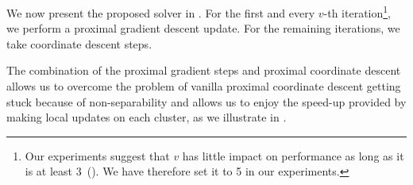 We now present the proposed solver in .
For the first and every $v$-th iteration\footnote{Our experiments suggest that \(v\) has little impact on performance as long as it is at least 3~(). We have therefore set it to 5 in our experiments.}, we perform a proximal gradient descent update.
For the remaining iterations, we take coordinate descent steps.

\begin{algorithm}[hbt]
  \caption{%
    Hybrid coordinate descent and proximal gradient descent algorithm
    for SLOPE\label{alg:hybrid}}

  \Return{\(\beta\)}
\end{algorithm}

The combination of the proximal gradient steps and proximal coordinate descent allows us to overcome the problem of vanilla proximal coordinate descent getting stuck because of non-separability and allows us to enjoy the speed-up provided by making local updates on each cluster, as we illustrate in .

